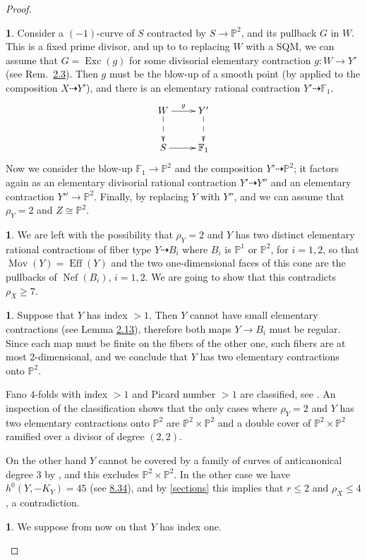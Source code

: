 \documentclass[10pt,a4paper]{amsart}
\theoremstyle{definition}
\newtheorem{prg}[thm]{}
\numberwithin{figure}{section}
\numberwithin{table}{section}
\newcommand{\pr}{\mathbb{P}}
\newcommand{\Exc}{\operatorname{Exc}}
\newcommand{\Eff}{\operatorname{Eff}}
\newcommand{\Nef}{\operatorname{Nef}}
\newcommand{\Mov}{\operatorname{Mov}}
\begin{document}
\begin{proof}
\begin{prg}
    Consider a $(-1)$-curve of $S$ contracted by $S \to \pr^2$, and its pullback $G$ in $W$. This is a fixed
prime divisor, and up to to replacing  $W$ with a SQM, we can assume that $G = \Exc(g)$ for some
divisorial elementary contraction $g \colon W \to Y'$ (see Rem.~\href{https://arxiv.org/abs/2508.21207v1}{2.3}). Then $g$ must be the blow-up of a smooth point (by \cite[Lemma 4.19(2)]{blowup} applied to the composition $X\dasharrow Y'$), and there is an elementary rational contraction $Y'\dasharrow \mathbb{F}_1$.
$$\xymatrix{{W}\ar[r]^g\ar@{-->}[d]&{Y'}\ar@{-->}[d]\\
S\ar[r]&{\mathbb{F}_1}
}$$
Now we consider the blow-up $\mathbb{F}_1\to\pr^2$ and the composition $Y'\dasharrow \pr^2$; it factors again as an elementary divisorial rational contraction $Y'\dasharrow Y''$ and an elementary contraction $Y''\to\pr^2$. Finally, by replacing $Y$ with $Y''$,
 and we can assume that $\rho_Y=2$ and $Z\cong\pr^2$.
\end{prg}
  \begin{prg}
    We are left with the possibility that $\rho_Y=2$ and $Y$ has two distinct elementary rational contractions of fiber type $Y\dasharrow B_i$  where $B_i$ is $\pr^1$ or $\pr^2$, for $i=1,2$, so that $\Mov(Y)=\Eff(Y)$ and the two one-dimensional faces of this cone are the pullbacks of $\Nef(B_i)$, $i=1,2$.
    We are going to show that
   this contradicts $\rho_X\geq 7$.
   \end{prg}
 \begin{prg}\label{flixbus}
Suppose that $Y$ has index $>1$. Then $Y$ cannot have small elementary contractions (see Lemma \href{https://arxiv.org/abs/2508.21207v1}{2.13}), therefore 
both maps $Y\to B_i$ must be regular. Since each map must be finite on the fibers of the other one, such fibers are at most $2$-dimensional, and we conclude that $Y$ has two elementary contractions onto $\pr^2$.

Fano $4$-folds with index $>1$ and Picard number $>1$ are classified, see \cite[Cor.~3.1.15, Th.~3.3.1, Th.~7.2.15]{fanoEMS}. An inspection of the classification shows that the only cases where $\rho_Y=2$ and $Y$ has  two elementary contractions onto $\pr^2$ are $\pr^2\times\pr^2$ and 
a double cover of $\pr^2\times\pr^2$ ramified over a divisor of degree $(2,2)$.

On the other hand $Y$ cannot be covered by a family of curves of anticanonical degree $3$ by \cite[Lemma 3.12]{blowup}, and this excludes $\pr^2\times\pr^2$. In the other case
we have $h^0(Y,-K_Y)=45$ (see \href{https://arxiv.org/abs/2508.21207v1}{8.34}), and by \eqref{sections} this implies that $r\leq 2$ and $\rho_X\leq 4$, a contradiction.
\end{prg}
  \begin{prg}\label{duo}
We suppose from now on that $Y$ has index one.


\end{prg}
\end{proof}
\end{document}
